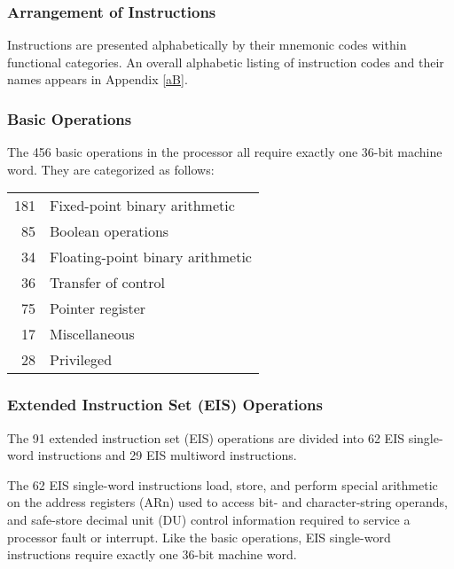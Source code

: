 \subsubsection{Arrangement of Instructions}

Instructions are presented alphabetically by their mnemonic codes within functional categories. An overall alphabetic listing of instruction codes and their names appears in Appendix \ref{aB}.


\subsubsection{Basic Operations}

The 456 basic operations in the processor all require exactly one 36-bit
machine word.  They are categorized as follows:


\begin{tabular}{ r l }

181 & Fixed-point binary arithmetic \\
85 & Boolean operations\\
34 & Floating-point binary arithmetic \\
36 & Transfer of control \\
75 & Pointer register \\
17 & Miscellaneous \\
28 & Privileged \\
\end{tabular}



\subsubsection{Extended Instruction Set (EIS) Operations}

The 91 extended instruction set (EIS) operations are divided into 62 EIS
single-word instructions and 29 EIS multiword instructions.



The 62 EIS single-word instructions load, store, and perform special arithmetic
on the address registers (ARn) used to access bit- and character-string
operands, and safe-store decimal unit (DU) control information required to
service a processor fault or interrupt. Like the basic operations, EIS
single-word instructions require exactly one 36-bit machine word.  


